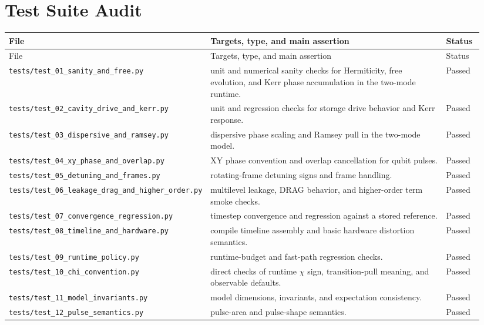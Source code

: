 \documentclass[11pt]{article}
\begin{document}
\section{Test Suite Audit}
\small
\begin{longtable}{p{0.30\linewidth} p{0.56\linewidth} p{0.08\linewidth}}
\toprule
File & Targets, type, and main assertion & Status \\
\midrule
\endfirsthead
\toprule
File & Targets, type, and main assertion & Status \\
\midrule
\endhead
\texttt{tests/test\_01\_sanity\_and\_free.py} & unit and numerical sanity checks for Hermiticity, free evolution, and Kerr phase accumulation in the two-mode runtime. & Passed \\
\texttt{tests/test\_02\_cavity\_drive\_and\_kerr.py} & unit and regression checks for storage drive behavior and Kerr response. & Passed \\
\texttt{tests/test\_03\_dispersive\_and\_ramsey.py} & dispersive phase scaling and Ramsey pull in the two-mode model. & Passed \\
\texttt{tests/test\_04\_xy\_phase\_and\_overlap.py} & XY phase convention and overlap cancellation for qubit pulses. & Passed \\
\texttt{tests/test\_05\_detuning\_and\_frames.py} & rotating-frame detuning signs and frame handling. & Passed \\
\texttt{tests/test\_06\_leakage\_drag\_and\_higher\_order.py} & multilevel leakage, DRAG behavior, and higher-order term smoke checks. & Passed \\
\texttt{tests/test\_07\_convergence\_regression.py} & timestep convergence and regression against a stored reference. & Passed \\
\texttt{tests/test\_08\_timeline\_and\_hardware.py} & compile timeline assembly and basic hardware distortion semantics. & Passed \\
\texttt{tests/test\_09\_runtime\_policy.py} & runtime-budget and fast-path regression checks. & Passed \\
\texttt{tests/test\_10\_chi\_convention.py} & direct checks of runtime \(\chi\) sign, transition-pull meaning, and observable defaults. & Passed \\
\texttt{tests/test\_11\_model\_invariants.py} & model dimensions, invariants, and expectation consistency. & Passed \\
\texttt{tests/test\_12\_pulse\_semantics.py} & pulse-area and pulse-shape semantics. & Passed \\

\end{longtable}
\end{document}
